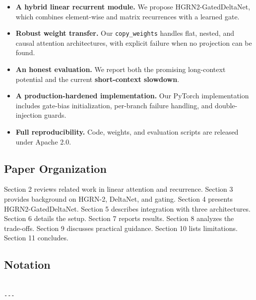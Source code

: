 \begin{itemize}
\item \textbf{A hybrid linear recurrent module.} We propose HGRN2-GatedDeltaNet,
  which combines element-wise and matrix recurrences with a learned gate.
\item \textbf{Robust weight transfer.} Our \texttt{copy\_weights} handles flat, nested, and
  causal attention architectures, with explicit failure when no projection
  can be found.
\item \textbf{An honest evaluation.} We report both the promising long-context potential
  and the current \textbf{short-context slowdown}.
\item \textbf{A production-hardened implementation.} Our PyTorch implementation
  includes gate-bias initialization, per-branch failure handling, and
  double-injection guards.
\item \textbf{Full reproducibility.} Code, weights, and evaluation scripts are
  released under Apache 2.0.

\end{itemize}
\subsection{Paper Organization}

Section 2 reviews related work in linear attention and recurrence. Section 3 
provides background on HGRN-2, DeltaNet, and gating. Section 4 presents 
HGRN2-GatedDeltaNet. Section 5 describes integration with three architectures. 
Section 6 details the setup. Section 7 reports results. Section 8 analyzes 
the trade-offs. Section 9 discusses practical guidance. Section 10 lists 
limitations. Section 11 concludes.



\subsection{Notation}

\begin{lstlisting}

---
\end{lstlisting}
